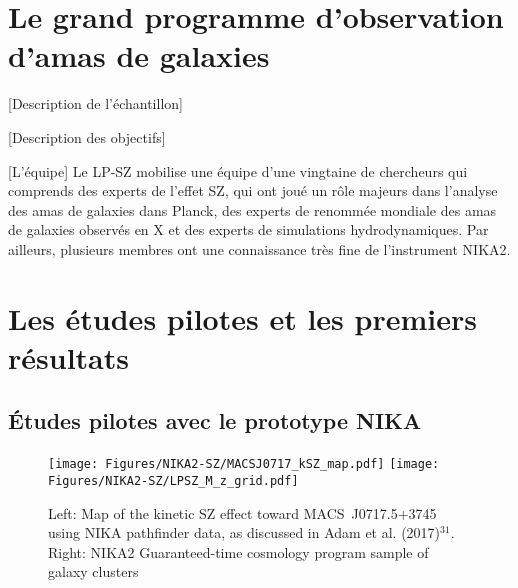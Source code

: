 %
%
%
%
%
%
%
%
\section{Le grand programme d'observation d'amas de galaxies}
\label{se:LP-SZ}

[Description de l'échantillon]
{\color{vert}\lipsum[2]}

[Description des objectifs]
{\color{vert}\lipsum[3]}

[L'équipe] Le LP-SZ mobilise une équipe d'une vingtaine de chercheurs
qui comprends des experts de l'effet SZ, qui ont joué un rôle majeurs
dans l'analyse des amas de galaxies dans Planck, des experts de
renommée mondiale des amas de galaxies observés en X et des experts de
simulations hydrodynamiques. Par ailleurs, plusieurs membres ont une
connaissance très fine de l'instrument NIKA2.\\



%
%
%
%
%
%
%
%
\section{Les études pilotes et les premiers résultats}

\subsection{\'Etudes pilotes avec le prototype NIKA}
{\color{vert}\lipsum[5-7]}

\begin{figure}
  \centering
  \texttt{[image: Figures/NIKA2-SZ/MACSJ0717\_kSZ\_map.pdf]}
  \hspace{4mm}
  \texttt{[image: Figures/NIKA2-SZ/LPSZ\_M\_z\_grid.pdf]}
  \caption{Left: Map of the kinetic SZ effect toward \mbox{MACS~J0717.5+3745} using NIKA pathfinder data, as discussed in Adam et al. (2017)$^{31}$. Right: NIKA2 Guaranteed-time cosmology program sample of galaxy clusters}
  \label{fig:nikanika2}
\end{figure}


